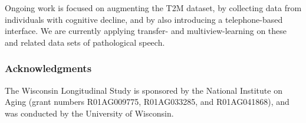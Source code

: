 \documentclass{article}
\begin{document}
Ongoing work is focused on augmenting the T2M dataset, by collecting data from individuals with cognitive decline, and by also introducing a telephone-based interface. We are currently applying transfer- and multiview-learning on these and related data sets of pathological speech. 

\subsubsection*{Acknowledgments}

The Wisconsin Longitudinal Study is sponsored by the National Institute on Aging (grant numbers R01AG009775, R01AG033285, and R01AG041868), and was conducted by the University of Wisconsin.



\small

\end{document}
